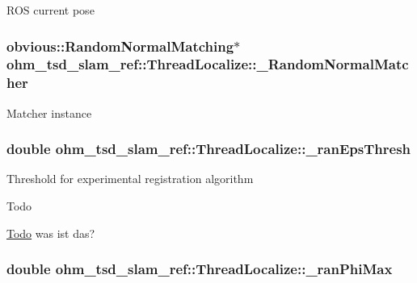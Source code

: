R\-O\-S current pose \hypertarget{classohm__tsd__slam__ref_1_1ThreadLocalize_a527f8668ebe51a6bc7cadba7075c8c3f}{
\subsubsection[{\-\_\-\-Random\-Normal\-Matcher}]{\setlength{\rightskip}{0pt plus 5cm}obvious\-::\-Random\-Normal\-Matching$\ast$ ohm\-\_\-tsd\-\_\-slam\-\_\-ref\-::\-Thread\-Localize\-::\-\_\-\-Random\-Normal\-Matcher\hspace{0.3cm}{\ttfamily [private]}}}\label{classohm__tsd__slam__ref_1_1ThreadLocalize_a527f8668ebe51a6bc7cadba7075c8c3f}
Matcher instance \hypertarget{classohm__tsd__slam__ref_1_1ThreadLocalize_a2e9f4af9a78a5c16b1a4966b1e28a27b}{
\subsubsection[{\-\_\-ran\-Eps\-Thresh}]{\setlength{\rightskip}{0pt plus 5cm}double ohm\-\_\-tsd\-\_\-slam\-\_\-ref\-::\-Thread\-Localize\-::\-\_\-ran\-Eps\-Thresh\hspace{0.3cm}{\ttfamily [private]}}}\label{classohm__tsd__slam__ref_1_1ThreadLocalize_a2e9f4af9a78a5c16b1a4966b1e28a27b}
Threshold for experimental registration algorithm \begin{DoxyRefDesc}{Todo}
\item[\hyperlink{todo__todo000021}{Todo}]was ist das? \end{DoxyRefDesc}
\hypertarget{classohm__tsd__slam__ref_1_1ThreadLocalize_a5ab8f03d41a726e561c95be6d6f090a7}{
\subsubsection[{\-\_\-ran\-Phi\-Max}]{\setlength{\rightskip}{0pt plus 5cm}double ohm\-\_\-tsd\-\_\-slam\-\_\-ref\-::\-Thread\-Localize\-::\-\_\-ran\-Phi\-Max\hspace{0.3cm}{\ttfamily [private]}}}\label{classohm__tsd__slam__ref_1_1ThreadLocalize_a5ab8f03d41a726e561c95be6d6f090a7}
